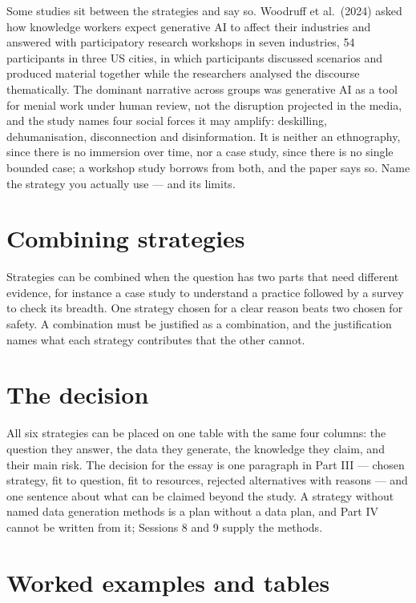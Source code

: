 \documentclass[11pt,a4paper,british,twoside=false,headings=small,chapterprefix=false,numbers=noenddot]{scrbook}
\begin{document}
Some studies sit between the strategies and say so. Woodruff et al.\ (2024) asked how knowledge workers expect generative AI to affect their industries and answered with participatory research workshops in seven industries, 54 participants in three US cities, in which participants discussed scenarios and produced material together while the researchers analysed the discourse thematically. The dominant narrative across groups was generative AI as a tool for menial work under human review, not the disruption projected in the media, and the study names four social forces it may amplify: deskilling, dehumanisation, disconnection and disinformation. It is neither an ethnography, since there is no immersion over time, nor a case study, since there is no single bounded case; a workshop study borrows from both, and the paper says so. Name the strategy you actually use --- and its limits.

\section{Combining strategies}

Strategies can be combined when the question has two parts that need different evidence, for instance a case study to understand a practice followed by a survey to check its breadth. One strategy chosen for a clear reason beats two chosen for safety. A combination must be justified as a combination, and the justification names what each strategy contributes that the other cannot.

\section{The decision}

All six strategies can be placed on one table with the same four columns: the question they answer, the data they generate, the knowledge they claim, and their main risk. The decision for the essay is one paragraph in Part III --- chosen strategy, fit to question, fit to resources, rejected alternatives with reasons --- and one sentence about what can be claimed beyond the study. A strategy without named data generation methods is a plan without a data plan, and Part IV cannot be written from it; Sessions 8 and 9 supply the methods.


\section{Worked examples and tables}
\end{document}
